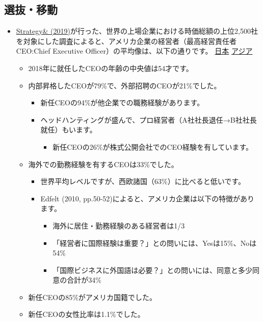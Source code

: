 \documentclass[
]{book}
\providecommand{\tightlist}{%
  \setlength{\itemsep}{0pt}\setlength{\parskip}{0pt}}
\begin{document}
\hypertarget{us-selection}{%
\subsection{選抜・移動}\label{us-selection}}

\begin{itemize}
\item
  \href{https://www.strategyand.pwc.com/jp/ja/publications/2018_ceo-data-media-release-jp.pdf}{Strategy\& (2019)}が行った、世界の上場企業における時価総額の上位2,500社を対象にした調査によると、アメリカ企業の経営者（最高経営責任者CEO:Chief Executive Officer）の平均像は、以下の通りです。 \protect\hyperlink{japan-selection}{日本} \protect\hyperlink{asia-selection}{アジア}

  \begin{itemize}
  \item
    2018年に就任したCEOの年齢の中央値は54才です。
  \item
    内部昇格したCEOが79\%で、外部招聘のCEOが21\%でした。

    \begin{itemize}
    \item
      新任CEOの94\%が他企業での職務経験があります。
    \item
      ヘッドハンティングが盛んで、プロ経営者（A社社長退任→B社社長就任）もいます。

      \begin{itemize}
      \tightlist
      \item
        新任CEOの26\%が株式公開会社でのCEO経験を有しています。
      \end{itemize}
    \end{itemize}
  \item
    海外での勤務経験を有するCEOは33\%でした。
    　

    \begin{itemize}
    \item
      世界平均レベルですが、西欧諸国（63\%）に比べると低いです。
    \item
      Edfelt (2010, pp.50-52)によると、アメリカ企業は以下の特徴があります。

      \begin{itemize}
      \item
        海外に居住・勤務経験のある経営者は1/3
      \item
        「経営者に国際経験は重要？」との問いには、Yesは15\%、Noは54\%
      \item
        「国際ビジネスに外国語は必要？」との問いには、同意と多少同意の合計が34\%
      \end{itemize}
    \end{itemize}
  \item
    新任CEOの85\%がアメリカ国籍でした。
  \item
    新任CEOの女性比率は1.1\%でした。
    　


\end{itemize}
\end{itemize}
\end{document}
